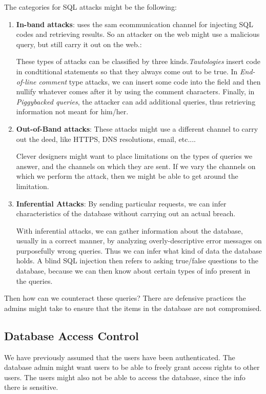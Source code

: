 \documentclass{article}
\begin{document}
 The categories for SQL attacks might be the following:
 \begin{enumerate}
		 \item{\textbf{In-band attacks}}: uses the sam ecommunication channel for injecting SQL codes and 
				 retrieving results. So an attacker on the web might use a malicious query, but still carry
				 it out on the web.:

				 These types of attacks can be classified by three kinds.\textit{Tautologies} insert code in
				 condtitional statements so that they always come out to be true. In \textit{End-of-line comment}
				 type attacks, we can insert some code into the field and then nullify whatever comes after it 
				 by using the comment characters. Finally, in \textit{Piggybacked queries}, the attacker can add
				 additional queries, thus retrieving information not meant for him/her.
		 \item{\textbf{Out-of-Band attacks}}: These attacks might use a different channel to carry out the deed, like
				 HTTPS, DNS resolutions, email, etc....

				 Clever designers might want to place limitations on the types of queries we answer, and the channels
				 on which they are sent. If we vary the channels on which we perform the attack, then we might be able
				 to get around the limitation.
		 \item{\textbf{Inferential Attacks}}: By sending particular requests, we can infer characteristics of the 
				 database without carrying out an actual breach.

				 With inferential attacks, we can gather information about the database, usually in a correct manner,
				 by analyzing overly-descriptive error messages on purposefully wrong queries. Thus we can infer what kind
				 of data the database holds. A blind SQL injection then refers to asking true/false questions to the 
				 database, because we can then know about certain types of info present in the queries.
 \end{enumerate}

 Then how can we counteract these queries? There are defensive practices the admins might take to ensure that the 
 items in the database are not compromised.
 \subsection{Database Access Control}
 We have previously assumed that the users have been authenticated. The database admin might want users to be able 
 to freely grant access rights to other users. The users might also not be able to access the database, since the info
 there is sensitive.
\end{document}
